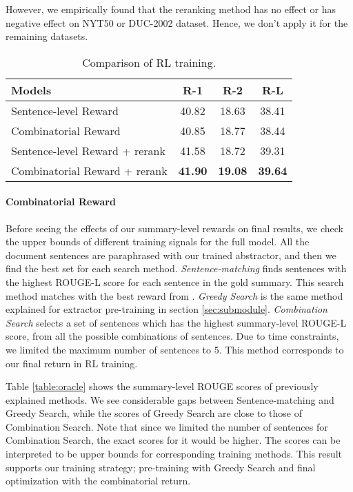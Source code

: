 \documentclass[11pt,a4paper]{article}
\begin{document}
However, we empirically found that the reranking method
has no effect or has negative effect on NYT50 or DUC-2002 dataset.
Hence, we don't apply it for the remaining datasets.

\begin{table}
\begin{center}
\begin{adjustbox}{max width=0.95\columnwidth}
\begin{tabular}{l|ccc}
    \hline 
    \bf Models & \bf R-1 & \bf R-2 & \bf R-L \\ 
    \hline
    Sentence-level Reward & 40.82 & 18.63 & 38.41 \\
    Combinatorial Reward & 40.85 & 18.77 & 38.44 \\
    \hline
    Sentence-level Reward + rerank & 41.58 & 18.72 & 39.31 \\
    Combinatorial Reward + rerank & \bf 41.90 & \bf 19.08 & \bf 39.64 \\
    \hline
\end{tabular}
\end{adjustbox}
\end{center}
\caption{\label{table:ablation} Comparison of RL training.}
\end{table}


\paragraph{Combinatorial Reward}
Before seeing the effects of our summary-level rewards on final results,
we check the upper bounds of different training signals for the full model.
All the document sentences are paraphrased with our trained abstractor,
and then we find the best set for each search method.
\emph{Sentence-matching} finds sentences with the highest ROUGE-L score for
each sentence in the gold summary. This search method matches with the
best reward from \citet{chen-bansal-2018-fast}.
\emph{Greedy Search} is the same method explained for
extractor pre-training in section \ref{sec:submodule}.
\emph{Combination Search} selects a set of sentences
which has the highest summary-level ROUGE-L score,
from all the possible combinations of sentences.
Due to time constraints, we limited the maximum number
of sentences to 5. This method corresponds to our final return
in RL training.

Table \ref{table:oracle} shows the
summary-level ROUGE scores of previously explained methods.
We see considerable gaps between Sentence-matching and Greedy Search,
while the scores of Greedy Search are close to those of Combination Search.
Note that since we limited the number of sentences for Combination Search,
the exact scores for it would be higher.
The scores can be interpreted to be upper bounds for corresponding training methods.
This result supports our training strategy; pre-training with
Greedy Search and final optimization with the combinatorial return.
\end{document}
